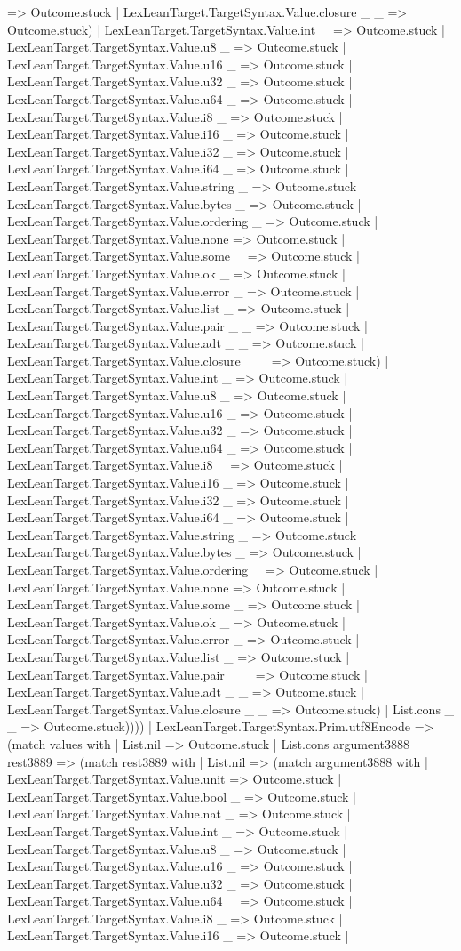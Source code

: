 \documentclass[11pt]{article}
\begin{document}
=> Outcome.stuck | LexLeanTarget.TargetSyntax.Value.closure \_ \_ => Outcome.stuck) | LexLeanTarget.TargetSyntax.Value.int \_ => Outcome.stuck | LexLeanTarget.TargetSyntax.Value.u8 \_ => Outcome.stuck | LexLeanTarget.TargetSyntax.Value.u16 \_ => Outcome.stuck | LexLeanTarget.TargetSyntax.Value.u32 \_ => Outcome.stuck | LexLeanTarget.TargetSyntax.Value.u64 \_ => Outcome.stuck | LexLeanTarget.TargetSyntax.Value.i8 \_ => Outcome.stuck | LexLeanTarget.TargetSyntax.Value.i16 \_ => Outcome.stuck | LexLeanTarget.TargetSyntax.Value.i32 \_ => Outcome.stuck | LexLeanTarget.TargetSyntax.Value.i64 \_ => Outcome.stuck | LexLeanTarget.TargetSyntax.Value.string \_ => Outcome.stuck | LexLeanTarget.TargetSyntax.Value.bytes \_ => Outcome.stuck | LexLeanTarget.TargetSyntax.Value.ordering \_ => Outcome.stuck | LexLeanTarget.TargetSyntax.Value.none => Outcome.stuck | LexLeanTarget.TargetSyntax.Value.some \_ => Outcome.stuck | LexLeanTarget.TargetSyntax.Value.ok \_ => Outcome.stuck | LexLeanTarget.TargetSyntax.Value.error \_ => Outcome.stuck | LexLeanTarget.TargetSyntax.Value.list \_ => Outcome.stuck | LexLeanTarget.TargetSyntax.Value.pair \_ \_ => Outcome.stuck | LexLeanTarget.TargetSyntax.Value.adt \_ \_ => Outcome.stuck | LexLeanTarget.TargetSyntax.Value.closure \_ \_ => Outcome.stuck) | LexLeanTarget.TargetSyntax.Value.int \_ => Outcome.stuck | LexLeanTarget.TargetSyntax.Value.u8 \_ => Outcome.stuck | LexLeanTarget.TargetSyntax.Value.u16 \_ => Outcome.stuck | LexLeanTarget.TargetSyntax.Value.u32 \_ => Outcome.stuck | LexLeanTarget.TargetSyntax.Value.u64 \_ => Outcome.stuck | LexLeanTarget.TargetSyntax.Value.i8 \_ => Outcome.stuck | LexLeanTarget.TargetSyntax.Value.i16 \_ => Outcome.stuck | LexLeanTarget.TargetSyntax.Value.i32 \_ => Outcome.stuck | LexLeanTarget.TargetSyntax.Value.i64 \_ => Outcome.stuck | LexLeanTarget.TargetSyntax.Value.string \_ => Outcome.stuck | LexLeanTarget.TargetSyntax.Value.bytes \_ => Outcome.stuck | LexLeanTarget.TargetSyntax.Value.ordering \_ => Outcome.stuck | LexLeanTarget.TargetSyntax.Value.none => Outcome.stuck | LexLeanTarget.TargetSyntax.Value.some \_ => Outcome.stuck | LexLeanTarget.TargetSyntax.Value.ok \_ => Outcome.stuck | LexLeanTarget.TargetSyntax.Value.error \_ => Outcome.stuck | LexLeanTarget.TargetSyntax.Value.list \_ => Outcome.stuck | LexLeanTarget.TargetSyntax.Value.pair \_ \_ => Outcome.stuck | LexLeanTarget.TargetSyntax.Value.adt \_ \_ => Outcome.stuck | LexLeanTarget.TargetSyntax.Value.closure \_ \_ => Outcome.stuck) | List.cons \_ \_ => Outcome.stuck)))) | LexLeanTarget.TargetSyntax.Prim.utf8Encode => (match values with | List.nil => Outcome.stuck | List.cons argument3888 rest3889 => (match rest3889 with | List.nil => (match argument3888 with | LexLeanTarget.TargetSyntax.Value.unit => Outcome.stuck | LexLeanTarget.TargetSyntax.Value.bool \_ => Outcome.stuck | LexLeanTarget.TargetSyntax.Value.nat \_ => Outcome.stuck | LexLeanTarget.TargetSyntax.Value.int \_ => Outcome.stuck | LexLeanTarget.TargetSyntax.Value.u8 \_ => Outcome.stuck | LexLeanTarget.TargetSyntax.Value.u16 \_ => Outcome.stuck | LexLeanTarget.TargetSyntax.Value.u32 \_ => Outcome.stuck | LexLeanTarget.TargetSyntax.Value.u64 \_ => Outcome.stuck | LexLeanTarget.TargetSyntax.Value.i8 \_ => Outcome.stuck | LexLeanTarget.TargetSyntax.Value.i16 \_ => Outcome.stuck | 
\end{document}
